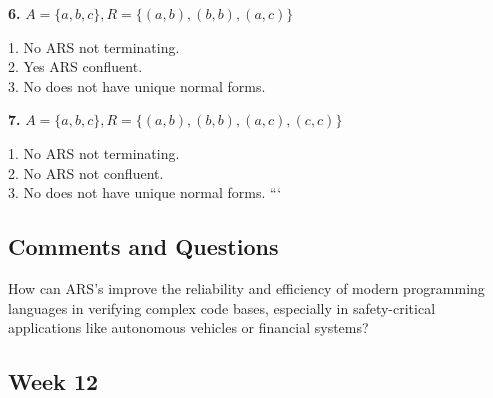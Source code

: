 \documentclass{article}
\theoremstyle{theorem}
\theoremstyle{definition}
\theoremstyle{remark}
\begin{document}
\textbf{6.} \( A = \{a, b, c\}, R = \{(a, b), (b, b), (a, c)\} \)
\begin{center}
\end{center}
\hspace*{0.6cm}1. No ARS not terminating. \\
\hspace*{0.6cm}2. Yes ARS confluent. \\
\hspace*{0.6cm}3. No does not have unique normal forms.

\textbf{7.} \( A = \{a, b, c\}, R = \{(a, b), (b, b), (a, c), (c, c)\} \)
\begin{center}
\end{center}
\hspace*{0.6cm}1. No ARS not terminating. \\
\hspace*{0.6cm}2. No ARS not confluent. \\
\hspace*{0.6cm}3. No does not have unique normal forms.
```

\subsection*{Comments and Questions}

How can ARS's improve the reliability and efficiency of modern programming languages in verifying complex code bases, especially in safety-critical applications like autonomous vehicles or financial systems? 


\subsection{Week 12}
\end{document}
